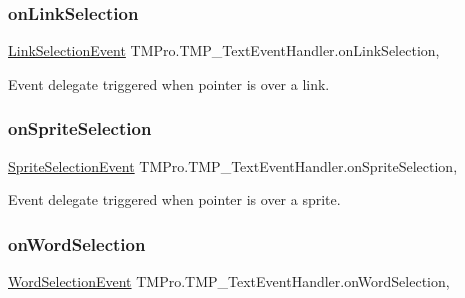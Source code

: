 \subsubsection{\texorpdfstring{on\+Link\+Selection}{onLinkSelection}}
{\footnotesize\ttfamily \hyperlink{classTMPro_1_1TMP__TextEventHandler_1_1LinkSelectionEvent}{Link\+Selection\+Event} T\+M\+Pro.\+T\+M\+P\+\_\+\+Text\+Event\+Handler.\+on\+Link\+Selection\hspace{0.3cm}{\ttfamily [get]}, {\ttfamily [set]}}



Event delegate triggered when pointer is over a link. 

\mbox{\label{classTMPro_1_1TMP__TextEventHandler_a363991aa14af2f191cc7c77846c134f9}} 
\subsubsection{\texorpdfstring{on\+Sprite\+Selection}{onSpriteSelection}}
{\footnotesize\ttfamily \hyperlink{classTMPro_1_1TMP__TextEventHandler_1_1SpriteSelectionEvent}{Sprite\+Selection\+Event} T\+M\+Pro.\+T\+M\+P\+\_\+\+Text\+Event\+Handler.\+on\+Sprite\+Selection\hspace{0.3cm}{\ttfamily [get]}, {\ttfamily [set]}}



Event delegate triggered when pointer is over a sprite. 

\mbox{\label{classTMPro_1_1TMP__TextEventHandler_aaba688a88f61b13eecf99e05725e6985}} 
\subsubsection{\texorpdfstring{on\+Word\+Selection}{onWordSelection}}
{\footnotesize\ttfamily \hyperlink{classTMPro_1_1TMP__TextEventHandler_1_1WordSelectionEvent}{Word\+Selection\+Event} T\+M\+Pro.\+T\+M\+P\+\_\+\+Text\+Event\+Handler.\+on\+Word\+Selection\hspace{0.3cm}{\ttfamily [get]}, {\ttfamily [set]}}



